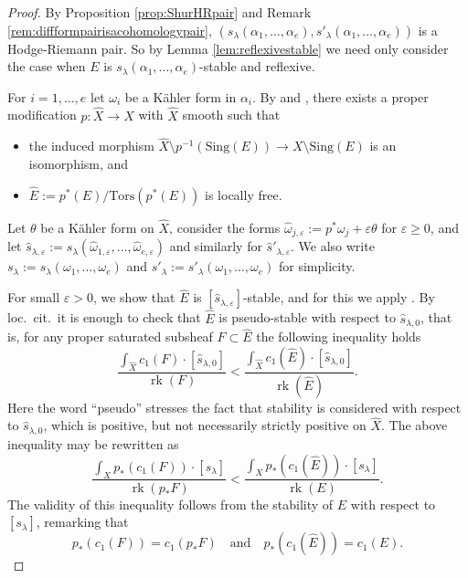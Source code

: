 \documentclass[a4,reqno]{amsart}
\theoremstyle{definition}
\def\Sing{\mbox{Sing}}
\def\Tors{\mbox{Tors}}
\DeclareMathOperator{\rk}{rk}
\numberwithin{equation}{section}
\begin{document}
\begin{proof}
By Proposition \ref{prop:ShurHRpair} and Remark \ref{rem:diffformpairisacohomologypair}, $(s_{\lambda}(\alpha_1,\ldots,\alpha_e),s'_{\lambda}(\alpha_1,\ldots,\alpha_e))$ is a Hodge-Riemann pair.  So by Lemma \ref{lem:reflexivestable} we need only consider the case when $E$ is $s_{\lambda}(\alpha_1,\ldots,\alpha_e)$-stable and reflexive. 

For $i=1,\ldots,e$ let $\omega_i$ be a K\"ahler form in $\alpha_i$.   By \cite{Rossi} and \cite{Wlodarczyk}, there exists a proper modification $p: \hat{X} \to X$ with $\hat{X}$ smooth such that 
\begin{itemize}
    \item the induced morphism $\hat{X} \setminus p^{-1}(\Sing(E)) \to X \setminus \Sing(E)$ is an isomorphism, and
    \item $\hat{E} := p^*(E)/\Tors(p^*(E))$ is locally free.
\end{itemize}
Let $\theta$ be a K\"ahler form on $\hat{X}$, consider the forms $\hat{\omega}_{j,\varepsilon} := p^*\omega_j + \varepsilon \theta$ for $\varepsilon \ge 0$, and let $\hat{s}_{\lambda,\varepsilon} := s_\lambda(\hat{\omega}_{1,\varepsilon},\ldots,\hat{\omega}_{e,\varepsilon})$ and similarly for $\hat{s}'_{\lambda,\varepsilon}$. We also write $s_\lambda := s_\lambda(\omega_1,\ldots,\omega_e)$ and $s'_\lambda := s'_\lambda(\omega_1,\ldots,\omega_e)$ for simplicity.   

For small $\varepsilon > 0$, we show that $\hat{E}$ is $[\hat{s}_{\lambda,\varepsilon}]$-stable, and for this we apply \cite[Corollary 6.10]{TomaLimitareaII}. By loc.\ cit.\ it is enough to check that $\hat{E}$ is pseudo-stable with respect to $\hat{s}_{\lambda,0}$, that is, for any proper saturated subsheaf $F \subset \hat{E}$ the following inequality holds
\[
    \frac{\int_{\hat{X}} c_1(F) \cdot [\hat{s}_{\lambda,0}]}{\rk(F)} < \frac{\int_{\hat{X}} c_1(\hat{E}) \cdot [\hat{s}_{\lambda,0}]}{\rk(\hat{E})}.
\]
Here the word ``pseudo'' stresses the fact that stability is considered with respect to $\hat{s}_{\lambda,0}$, which is positive, but not necessarily strictly positive on $\hat{X}$. The above inequality may be rewritten as
\[
    \frac{\int_X p_*(c_1(F))\cdot [s_\lambda]}{\rk(p_*F)} < \frac{\int_X p_*(c_1(\hat{E}))\cdot [s_\lambda]}{\rk(E)}.
\]
The validity of this inequality follows from the stability of $E$ with respect to $[s_\lambda]$, remarking that 
\[
    p_*(c_1(F)) = c_1(p_*F) \quad \text{and}\quad p_*(c_1(\hat{E})) = c_1(E). 
\]


\end{proof}
\end{document}
